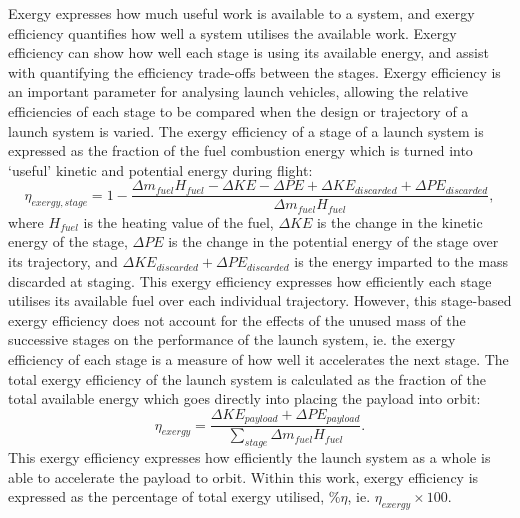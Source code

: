 Exergy expresses how much useful work is available to a system, and exergy efficiency quantifies how well a system utilises the available work. 
 Exergy efficiency can show how well each stage is using its available energy, and assist with quantifying the efficiency trade-offs between the stages.
 Exergy efficiency is an important parameter for analysing launch vehicles, allowing the relative efficiencies of each stage to be compared when the design or trajectory of a launch system is varied\cite{Gilbert2015}. The exergy efficiency of a stage of a launch system is expressed as the fraction of the fuel combustion energy which is turned into `useful' kinetic and potential energy during flight:
\begin{equation}
\eta_{exergy,stage} = 1 - \frac{\Delta m_{fuel}H_{fuel} - \Delta KE -\Delta PE + \Delta KE_{discarded} + \Delta PE_{discarded}}{\Delta m_{fuel}H_{fuel}},
\end{equation}
where $H_{fuel}$ is the heating value of the fuel, $\Delta KE$ is the change in the kinetic energy of the stage, $\Delta PE$ is the change in the potential energy of the stage over its trajectory, and $\Delta KE_{discarded} + \Delta PE_{discarded}$ is the energy imparted to the mass discarded at staging.
This exergy efficiency expresses how efficiently each stage utilises its available fuel over each individual trajectory. However, this stage-based exergy efficiency does not account for the effects of the unused mass of the successive stages on the performance of the launch system, ie. the exergy efficiency of each stage is a measure of how well it accelerates the next stage. The total exergy efficiency of the launch system is calculated as the fraction of the total available energy which goes directly into placing the payload into orbit:
\begin{equation}
\eta_{exergy} = \frac{\Delta KE_{payload} + \Delta PE_{payload}}{\sum_{stage} \Delta m_{fuel}H_{fuel}}.
\end{equation}
This exergy efficiency expresses how efficiently the launch system as a whole is able to accelerate the payload to orbit. 
Within this work, exergy efficiency is expressed as the percentage of total exergy utilised, \%$\eta$, ie. $\eta_{exergy} \times 100$.



